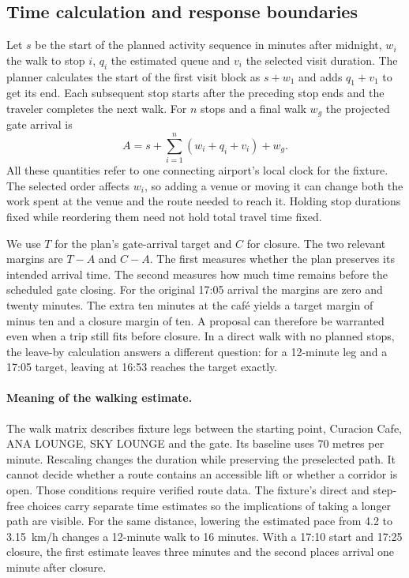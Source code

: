\documentclass[sigconf,nonacm,balance=false]{acmart}
\begin{document}
\subsection{Time calculation and response boundaries}
Let $s$ be the start of the planned activity sequence in minutes after midnight, $w_i$ the walk to stop $i$, $q_i$ the estimated queue and $v_i$ the selected visit duration. The planner calculates the start of the first visit block as $s+w_1$ and adds $q_1+v_1$ to get its end. Each subsequent stop starts after the preceding stop ends and the traveler completes the next walk. For $n$ stops and a final walk $w_g$ the projected gate arrival is
\[
 A=s+\sum_{i=1}^{n}(w_i+q_i+v_i)+w_g.
\]
All these quantities refer to one connecting airport's local clock for the fixture. The selected order affects $w_i$, so adding a venue or moving it can change both the work spent at the venue and the route needed to reach it. Holding stop durations fixed while reordering them need not hold total travel time fixed.

We use $T$ for the plan's gate-arrival target and $C$ for closure. The two relevant margins are $T-A$ and $C-A$. The first measures whether the plan preserves its intended arrival time. The second measures how much time remains before the scheduled gate closing. For the original 17:05 arrival the margins are zero and twenty minutes. The extra ten minutes at the caf\'e yields a target margin of minus ten and a closure margin of ten. A proposal can therefore be warranted even when a trip still fits before closure. In a direct walk with no planned stops, the leave-by calculation answers a different question: for a 12-minute leg and a 17:05 target, leaving at 16:53 reaches the target exactly.

\paragraph{Meaning of the walking estimate.} The walk matrix describes fixture legs between the starting point, Curacion Cafe, ANA LOUNGE, SKY LOUNGE and the gate. Its baseline uses 70 metres per minute. Rescaling changes the duration while preserving the preselected path. It cannot decide whether a route contains an accessible lift or whether a corridor is open. Those conditions require verified route data. The fixture's direct and step-free choices carry separate time estimates so the implications of taking a longer path are visible. For the same distance, lowering the estimated pace from 4.2 to 3.15~km/h changes a 12-minute walk to 16 minutes. With a 17:10 start and 17:25 closure, the first estimate leaves three minutes and the second places arrival one minute after closure.
\end{document}
